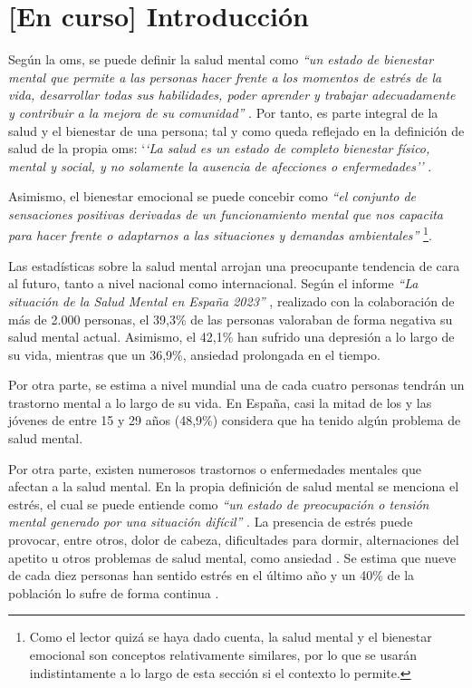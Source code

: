 \chapter{[En curso] Introducción}
\label{chapter:introduccion}


Según la \gls{oms}, se puede definir la salud mental como \textit{``un estado de bienestar mental que permite a las personas hacer frente a los momentos de estrés de la vida, desarrollar todas sus habilidades, poder aprender y trabajar adecuadamente y contribuir a la mejora de su comunidad''} \cite{oms_salud_2022}. Por tanto, es parte integral de la salud y el bienestar de una persona; tal y como queda reflejado en la definición de salud de la propia \gls{oms}: `\textit{`La salud es un estado de completo bienestar físico, mental y social, y no solamente la ausencia de afecciones o enfermedades''} \cite{feafes_galicia_que_nodate}.

Asimismo, el bienestar emocional se puede concebir como \textit{``el conjunto de sensaciones positivas derivadas de un funcionamiento mental que nos capacita para hacer frente o adaptarnos a las situaciones y demandas ambientales''} \cite{morer_linan_que_2019}  \footnote{Como el lector quizá se haya dado cuenta, la salud mental y el bienestar emocional son conceptos relativamente similares, por lo que se usarán indistintamente a lo largo de esta sección si el contexto lo permite.}.

Las estadísticas sobre la salud mental arrojan una preocupante tendencia de cara al futuro, tanto a nivel nacional como internacional. Según el informe \textit{``La situación de la Salud Mental en España 2023''} \cite{comunicacion_cuatro_2023}, realizado con la colaboración de más de 2.000 personas, el 39,3\% de las personas valoraban de forma negativa su salud mental actual. Asimismo, el 42,1\% han sufrido una depresión a lo largo de su vida, mientras que un 36,9\%, ansiedad prolongada en el tiempo. 

Por otra parte, se estima a nivel mundial una de cada cuatro personas tendrán un trastorno mental a lo largo de su vida. En España, casi la mitad de los y las jóvenes de entre 15 y 29 años (48,9\%) considera que ha tenido algún problema de salud mental.

Por otra parte, existen numerosos trastornos o enfermedades mentales que afectan a la salud mental. En la propia definición de salud mental se menciona el estrés, el cual se puede entiende como  \textit{``un estado de preocupación o tensión mental generado por una situación difícil''}  \cite{oms_estres_2023}. La presencia de estrés puede provocar, entre otros, dolor de cabeza, dificultades para dormir, alternaciones del apetito u otros problemas de salud mental, como ansiedad \cite{oms_estres_2023}. Se estima que nueve de cada diez personas han sentido estrés en el último año y un 40\% de la población lo sufre de forma continua \cite{nogera_mas_estres_2024}.

